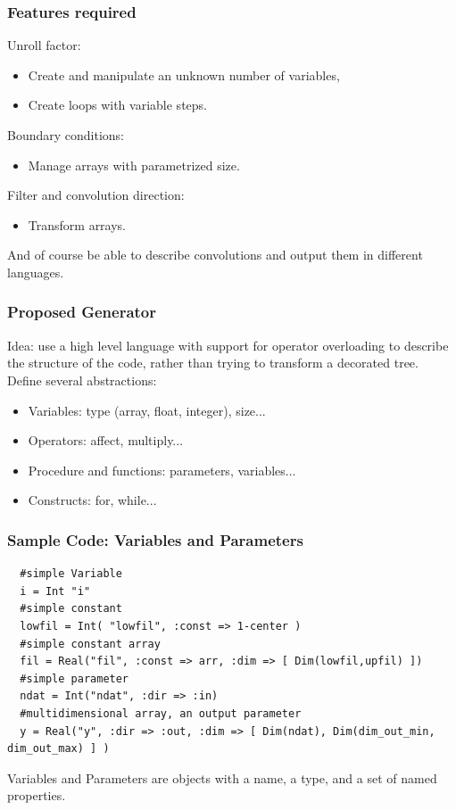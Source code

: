 \documentclass{beamer}
\begin{document}
\begin{frame}
\frametitle{Features required}
Unroll factor:
\begin{itemize}
\item Create and manipulate an unknown number of variables,
\item Create loops with variable steps.
\end{itemize}
Boundary conditions:
\begin{itemize}
\item Manage arrays with parametrized size.
\end{itemize}
Filter and convolution direction:
\begin{itemize}
\item Transform arrays.
\end{itemize}
And of course be able to describe convolutions and output them in different languages.
\end{frame}

\begin{frame}
\frametitle{Proposed Generator}
Idea: use a high level language with support for operator overloading to describe the structure of the code, rather than trying to transform a decorated tree.\\
Define several abstractions:
\begin{itemize}
\item Variables: type (array, float, integer), size...
\item Operators: affect, multiply...
\item Procedure and functions: parameters, variables...
\item Constructs: for, while...
\end{itemize}
\end{frame}

\begin{frame}[fragile]
\frametitle{Sample Code: Variables and Parameters}
\tiny
\begin{lstlisting}
  #simple Variable
  i = Int "i"
  #simple constant
  lowfil = Int( "lowfil", :const => 1-center )
  #simple constant array
  fil = Real("fil", :const => arr, :dim => [ Dim(lowfil,upfil) ])
  #simple parameter
  ndat = Int("ndat", :dir => :in)
  #multidimensional array, an output parameter
  y = Real("y", :dir => :out, :dim => [ Dim(ndat), Dim(dim_out_min, dim_out_max) ] )
\end{lstlisting}
\normalsize
Variables and Parameters are objects with a name, a type, and a set of named properties.
\end{frame}
\end{document}
